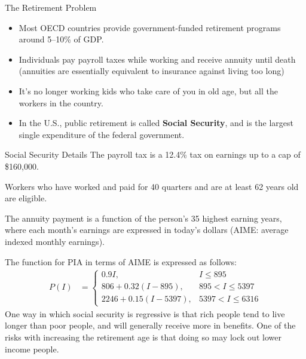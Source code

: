 \documentclass[8pt]{extarticle}
\begin{document}
\begin{problem}{The Retirement Problem}
\begin{itemize}
      \item Most OECD countries provide government-funded retirement programs around 5--10\% of GDP.
      \item Individuals pay payroll taxes while working and receive annuity until death (annuities are essentially equivalent to insurance against living too long) 
      \item It's no longer working kids who take care of you in old age, but all the workers in the country.
      \item In the U.S., public retirement is called \textbf{Social Security}, and is the largest single expenditure of the federal government.
    \end{itemize}
  \end{problem}
  \begin{problem}{Social Security Details}
    The payroll tax is a 12.4\% tax on earnings up to a cap of \$160,000.\newline

    Workers who have worked and paid for 40 quarters and are at least 62 years old are eligible.\newline

    The annuity payment is a function of the person's 35 highest earning years, where each month's earnings are expressed in today's dollars (AIME: average indexed monthly earnings).\newline

    The function for PIA in terms of AIME is expressed as follows:
    \begin{align*}
      P(I) &= \begin{cases}
        0.9I,& I \leq 895\\
        806 + 0.32(I - 895),& 895 < I \leq 5397\\
        2246 + 0.15(I - 5397),& 5397 < I \leq 6316
      \end{cases}
    \end{align*}
    One way in which social security is regressive is that rich people tend to live longer than poor people, and will generally receive more in benefits. One of the risks with increasing the retirement age is that doing so may lock out lower income people.\newline


\end{problem}
\end{document}
